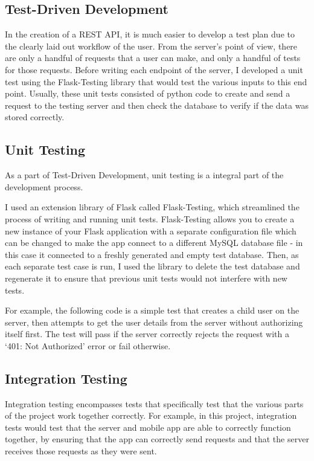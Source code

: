 \subsection{Test-Driven Development}
In the creation of a REST API, it is much easier to develop a test plan due to the clearly laid out workflow of the user. From the server's point of view, there are only a handful of requests that a user can make, and only a handful of tests for those requests. Before writing each endpoint of the server, I developed a unit test using the Flask-Testing library that would test the various inputs to this end point.
Usually, these unit tests consisted of python code to create and send a request to the testing server and then check the database to verify if the data was stored correctly.

\subsection{Unit Testing} 
As a part of Test-Driven Development, unit testing is a integral part of the development process.

I used an extension library of Flask called Flask-Testing, which streamlined the process of writing and running unit tests.
Flask-Testing allows you to create a new instance of your Flask application with a separate configuration file which can be changed to make the app connect to a different MySQL database file - in this case it connected to a freshly generated and empty test database.
Then, as each separate test case is run, I used the library to delete the test database and regenerate it to ensure that previous unit tests would not interfere with new tests.

For example, the following code is a simple test that creates a child user on the server, then attempts to get the user details from the server without authorizing itself first. 
The test will pass if the server correctly rejects the request with a `401: Not Authorized' error or fail otherwise.


\subsection{Integration Testing}
Integration testing encompasses tests that specifically test that the various parts of the project work together correctly.
For example, in this project, integration tests would test that the server and mobile app are able to correctly function together, by ensuring that the app can correctly send requests and that the server receives those requests as they were sent.

